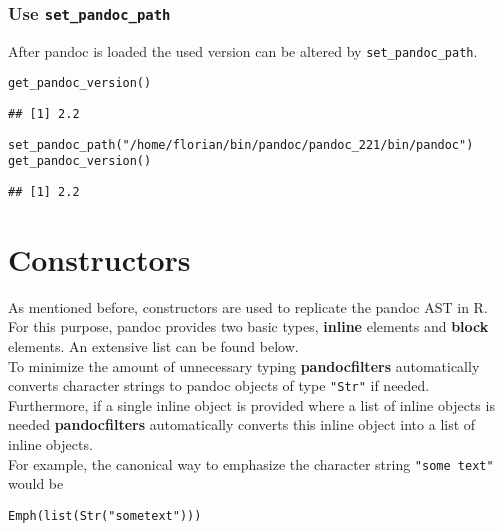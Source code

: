 \documentclass[a4paper]{article}\usepackage[]{graphicx}\usepackage[]{color}
\makeatletter
\newcommand{\hlstr}[1]{\textcolor[rgb]{0.741,0.553,0.545}{#1}}%
\newcommand{\hlstd}[1]{\textcolor[rgb]{0,0,0}{#1}}%
\newcommand{\hlkwd}[1]{\textcolor[rgb]{0,0,0}{#1}}%
\newenvironment{kframe}{%
 \def\at@end@of@kframe{}%
 \ifinner\ifhmode%
  \def\at@end@of@kframe{\end{minipage}}%
  \begin{minipage}{\columnwidth}%
 \fi\fi%
 \def\FrameCommand##1{\hskip\@totalleftmargin \hskip-\fboxsep
 \colorbox{shadecolor}{##1}\hskip-\fboxsep
     \hskip-\linewidth \hskip-\@totalleftmargin \hskip\columnwidth}%
 \MakeFramed {\advance\hsize-\width
   \@totalleftmargin\z@ \linewidth\hsize
   \@setminipage}}%
 {\par\unskip\endMakeFramed%
 \at@end@of@kframe}
\newenvironment{knitrout}{}{} %
\newcommand{\pkg}[1]{\textbf{#1}}
\newcommand{\code}[1]{\texttt{#1}}
\makeatother
\begin{document}
\subsubsection{Use \code{set\_pandoc\_path}}
After pandoc is loaded the used version can be altered by \code{set\_pandoc\_path}.
\begin{knitrout}
\color{fgcolor}\begin{kframe}
\begin{alltt}
\hlkwd{get_pandoc_version}\hlstd{()}
\end{alltt}
\begin{verbatim}
## [1] 2.2
\end{verbatim}
\begin{alltt}
\hlkwd{set_pandoc_path}\hlstd{(}\hlstr{"/home/florian/bin/pandoc/pandoc_221/bin/pandoc"}\hlstd{)}
\hlkwd{get_pandoc_version}\hlstd{()}
\end{alltt}
\begin{verbatim}
## [1] 2.2
\end{verbatim}
\end{kframe}
\end{knitrout}


\section{Constructors}
As mentioned before, constructors are used to replicate the pandoc AST in R.
For this purpose, pandoc provides two basic types, \textbf{inline} elements and 
\textbf{block} elements. An extensive list can be found below. \\

To minimize the amount of unnecessary typing \pkg{pandocfilters} automatically 
converts character strings to pandoc objects of type \code{"Str"} if needed.
Furthermore, if a single inline object is provided where a list of inline 
objects is needed \pkg{pandocfilters} automatically converts this inline 
object into a list of inline objects. \\

For example, the canonical way to emphasize the character string 
\code{"some text"} would be 
\begin{knitrout}
\color{fgcolor}\begin{kframe}
\begin{alltt}
\hlkwd{Emph}\hlstd{(}\hlkwd{list}\hlstd{(}\hlkwd{Str}\hlstd{(}\hlstr{"some text"}\hlstd{)))}
\end{alltt}
\end{kframe}
\end{knitrout}
\end{document}
